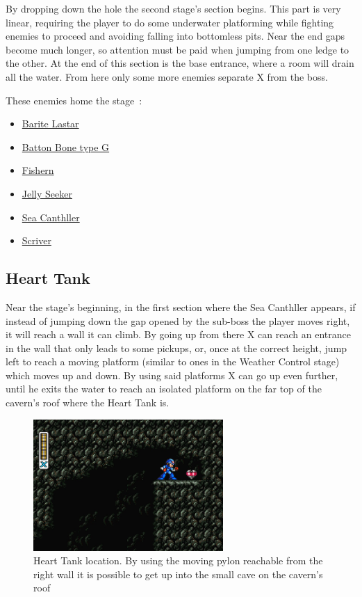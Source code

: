By dropping down the hole the second stage's section begins. This part is very linear, requiring the player to do some underwater platforming while fighting enemies to proceed and avoiding falling into bottomless pits. Near the end gaps become much longer, so attention must be paid when jumping from one ledge to the other. At the end of this section is the base entrance, where a room will drain all the water. From here only some more enemies separate X from the boss.

These enemies home the stage~\cite{wiki:Deep_sea}:
\begin{itemize}
	\item \hyperlink {enem:Barite_Lastar}{Barite Lastar}
	\item \hyperlink {enem:Batton_Bone_type_G}{Batton Bone type G}
	\item \hyperlink {enem:Fishern}{Fishern}
	\item \hyperlink {enem:Jelly_Seeker}{Jelly Seeker}
	\item \hyperlink {miniboss:Sea_Canthller}{Sea Canthller}
	\item \hyperlink {enem:Scriver}{Scriver}
\end{itemize}

\subsection{Heart Tank}
Near the stage's beginning, in the first section where the Sea Canthller appears, if instead of jumping down the gap opened by the sub-boss the player moves right, it will reach a wall it can climb. By going up from there X can reach an entrance in the wall that only leads to some pickups, or, once at the correct height, jump left to reach a moving platform (similar to ones in the Weather Control stage) which moves up and down. By using said platforms X can go up even further, until he exits the water  to reach an isolated platform on the far top of the cavern's roof where the Heart Tank is.
\begin{figure}[htp]
	\centering
	\includegraphics[height=5cm]{figures/X2/Bubble_crab/Crab_heart.png}
	\caption{Heart Tank location. By using the moving pylon reachable from the right wall it is possible to get up into the small cave on the cavern's roof}
\end{figure}

